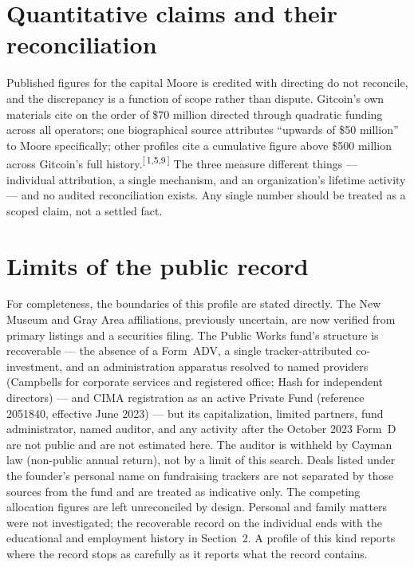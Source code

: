 \documentclass[11pt,letterpaper]{article}
\newcommand{\refn}[1]{\textsuperscript{[\,#1\,]}}
\begin{document}
\section{Quantitative claims and their reconciliation}

Published figures for the capital Moore is credited with directing do not
reconcile, and the discrepancy is a function of scope rather than dispute.
Gitcoin's own materials cite on the order of \$70 million directed through
quadratic funding across all operators; one biographical source attributes
``upwards of \$50 million'' to Moore specifically; other profiles cite a
cumulative figure above \$500 million across Gitcoin's full
history.\refn{1,5,9} The three measure different things --- individual
attribution, a single mechanism, and an organization's lifetime activity ---
and no audited reconciliation exists. Any single number should be treated as
a scoped claim, not a settled fact.

\section{Limits of the public record}

For completeness, the boundaries of this profile are stated directly. The
New Museum and Gray Area affiliations, previously uncertain, are now verified
from primary listings and a securities filing. The Public Works fund's
structure is recoverable --- the absence of a Form~ADV, a single
tracker-attributed co-investment, and an administration apparatus resolved to
named providers (Campbells for corporate services and registered office; Hash
for independent directors) --- and CIMA registration as an active
Private Fund (reference 2051840, effective June 2023) --- but its
capitalization, limited partners, fund administrator, named auditor, and any
activity after the October 2023 Form~D are not public and are not estimated
here. The auditor is withheld by Cayman law (non-public annual return), not by
a limit of this search. Deals listed under the founder's personal name on
fundraising trackers are not separated by those sources from the fund and are
treated as indicative only. The competing allocation figures are left
unreconciled by design.
Personal and family matters were not investigated; the recoverable record on
the individual ends with the educational and employment history in
Section~2. A profile of this kind reports where the record stops as
carefully as it reports what the record contains.
\end{document}
